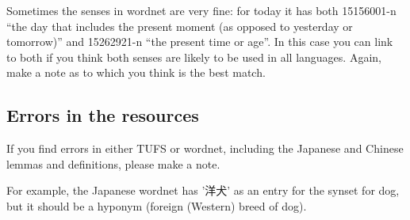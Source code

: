\documentclass[11pt]{article}
\begin{document}
Sometimes the senses in wordnet are very fine: for today it has both 
15156001-n ``the day that includes the present moment (as opposed to
yesterday or tomorrow)'' and 15262921-n ``the present time or age''.
In this case you can link to both if you think both senses are likely
to be used in all languages.  Again, make a note as to which you think
is the best match.




\subsection{Errors in the resources}

If you find errors in either TUFS or wordnet, including the Japanese
and Chinese lemmas and definitions, please make a note.

For example, the Japanese wordnet has '洋犬' as an entry for the
synset for dog, but it should be a hyponym (foreign (Western) breed of
dog).
\end{document}
